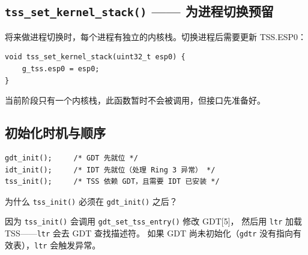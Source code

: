 \subsection{\texttt{tss\_set\_kernel\_stack()} —— 为进程切换预留}

将来做进程切换时，每个进程有独立的内核栈。切换进程后需要更新 TSS.ESP0：

\begin{lstlisting}[style=cstyle]
void tss_set_kernel_stack(uint32_t esp0) {
    g_tss.esp0 = esp0;
}
\end{lstlisting}

当前阶段只有一个内核栈，此函数暂时不会被调用，但接口先准备好。

\subsection{初始化时机与顺序}

\begin{lstlisting}[style=cstyle]
gdt_init();     /* GDT 先就位 */
idt_init();     /* IDT 先就位（处理 Ring 3 异常） */
tss_init();     /* TSS 依赖 GDT，且需要 IDT 已安装 */
\end{lstlisting}

\begin{whybox}
为什么 \texttt{tss\_init()} 必须在 \texttt{gdt\_init()} 之后？

因为 \texttt{tss\_init()} 会调用 \texttt{gdt\_set\_tss\_entry()} 修改 GDT[5]，
然后用 \texttt{ltr} 加载 TSS——\texttt{ltr} 会去 GDT 查找描述符。
如果 GDT 尚未初始化（\texttt{gdtr} 没有指向有效表），\texttt{ltr} 会触发异常。
\end{whybox}
